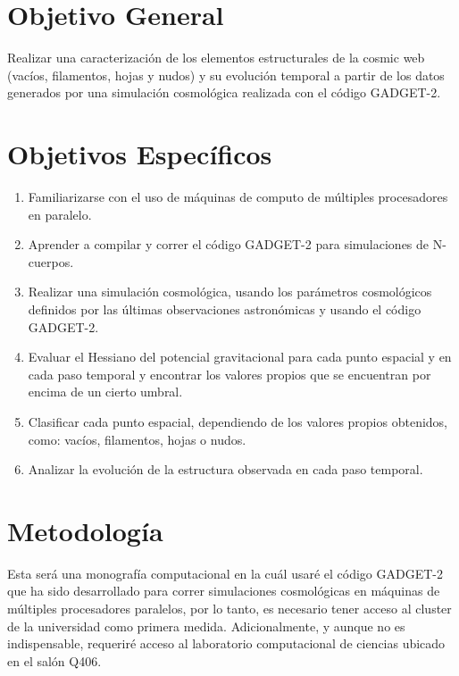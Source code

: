 \documentclass{article}
\begin{document}
\section{Objetivo General}

Realizar una caracterización de los elementos estructurales de la cosmic web (vacíos, filamentos, hojas y nudos) y su evolución temporal a partir de los datos generados por una simulación cosmológica realizada con el código GADGET-2.

\section{Objetivos Específicos}

\begin{enumerate}

\item Familiarizarse con el uso de máquinas de computo de múltiples procesadores en paralelo. 
\item Aprender a compilar y correr el código GADGET-2 para simulaciones de N-cuerpos.
\item Realizar una simulación cosmológica, usando los parámetros cosmológicos definidos por las últimas observaciones astronómicas y usando el código GADGET-2.
\item Evaluar el Hessiano del potencial gravitacional para cada punto espacial y en cada paso temporal y encontrar los valores propios que se encuentran por encima de un cierto umbral.
\item Clasificar cada punto espacial, dependiendo de los valores propios obtenidos, como: vacíos, filamentos, hojas o nudos.
\item Analizar la evolución de la estructura observada en cada paso temporal.

\end{enumerate}


\section{Metodología}

Esta será una monografía computacional en la cuál usaré el código GADGET-2 que ha sido desarrollado  para correr simulaciones cosmológicas en máquinas de múltiples procesadores paralelos, por lo tanto, es necesario tener acceso al cluster de la universidad como primera medida. Adicionalmente, y aunque no es indispensable, requeriré acceso al laboratorio computacional de ciencias ubicado en el salón Q406.
\end{document}
